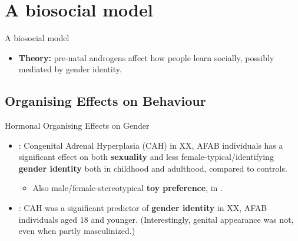 \documentclass[hyperref={pdfpagelabels=false}]{beamer}
\begin{document}

\section{A biosocial model}

\begin{frame}{A biosocial model}
	\begin{itemize}
	\item[ ] \textbf{Theory:} pre-natal androgens affect how people learn socially, possibly mediated by gender identity.
	\end{itemize}

\end{frame}




\subsection{Organising Effects on Behaviour}

\begin{frame}{Hormonal Organising Effects on Gender}
\begin{itemize}
	\item \citet{hinesetal2004}: Congenital Adrenal Hyperplasia (CAH) in XX, AFAB individuals has a significant effect on both \textbf{sexuality} and less female-typical/identifying \textbf{gender identity} both in childhood and adulthood, compared to controls.
	\begin{itemize}
	\item Also male/female-stereotypical \textbf{toy preference}, in \citet{pasterskietal2005}.
	\end{itemize}
	\item \citet{berenbaumbailey2003}: CAH was a significant predictor of \textbf{gender identity} in XX, AFAB individuals aged 18 and younger. (Interestingly, genital appearance was not, even when partly masculinized.)

\end{itemize}
\end{frame}
\end{document}
